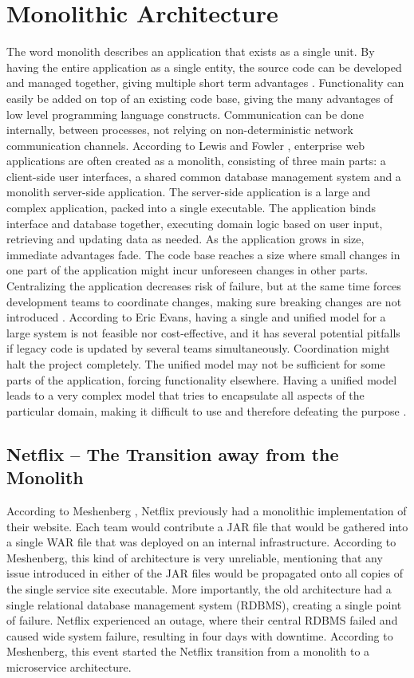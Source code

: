 \section{Monolithic Architecture}
The word monolith describes an application that exists as a single unit. By having the entire application as a single entity, the source code can be developed and managed together, giving multiple short term advantages \cite[p.~68]{long2017cloud}. Functionality can easily be added on top of an existing code base, giving the many advantages of low level programming language constructs. Communication can be done internally, between processes, not relying on non-deterministic network communication channels. 
According to Lewis and Fowler \cite{fowler2014microservices}, enterprise web applications are often created as a monolith, consisting of three main parts: a client-side user interfaces, a shared common database management system and a monolith server-side application. The server-side application is a large and complex application, packed into a single executable. The application binds interface and database together, executing domain logic based on user input, retrieving and updating data as needed.
As the application grows in size, immediate advantages fade. The code base reaches a size where small changes in one part of the application might incur unforeseen changes in other parts. Centralizing the application decreases risk of failure, but at the same time forces development teams to coordinate changes, making sure breaking changes are not introduced \cite[p.~68]{long2017cloud}. 
According to Eric Evans, having a single and unified model for a large system is not feasible nor cost-effective, and it has several potential pitfalls if legacy code is updated by several teams simultaneously. Coordination might halt the project completely. The unified model may not be sufficient for some parts of the application, forcing functionality elsewhere. Having a unified model leads to a very complex model that tries to encapsulate all aspects of the particular domain, making it difficult to use and therefore defeating the purpose \cite[p.~331]{evans2004domain}.

\subsection{Netflix -- The Transition away from the Monolith}
According to Meshenberg \cite{meshenberg2016microservices}, Netflix previously had a monolithic implementation of their website. Each team would contribute a JAR file that would be gathered into a single WAR file that was deployed on an internal infrastructure. According to Meshenberg, this kind of architecture is very unreliable, mentioning that any issue introduced in either of the JAR files would be propagated onto all copies of the single service site executable. More importantly, the old architecture had a single relational database management system (RDBMS), creating a single point of failure\cite{meshenberg2016microservices}. Netflix experienced an outage, where their central RDBMS failed and caused wide system failure, resulting in four days with downtime. According to Meshenberg, this event started the Netflix transition from a monolith to a microservice architecture.


